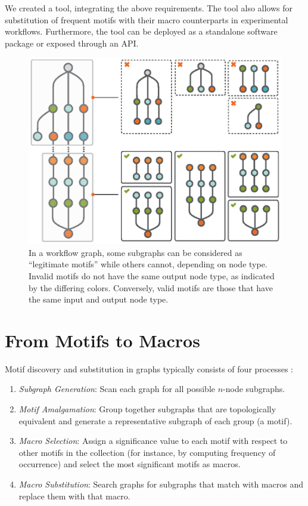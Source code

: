 We created a tool, integrating the above requirements.
The tool also allows for substitution of frequent motifs with their macro counterparts in experimental workflows.
Furthermore, the tool can be deployed as a standalone software package or exposed through an API.

\begin{figure}[t!]
\centering
\includegraphics[scale=.6]{images/automacron/valid-invalid-motifs.eps}
\caption{In a workflow graph, some subgraphs can be considered as ``legitimate motifs'' while others cannot, depending on node type. Invalid motifs do not have the same output node type, as indicated by the differing colors. Conversely, valid motifs are those that have the same input and output node type.}
\vspace{-3mm}
\label{fig:Conditions}
\end{figure}
\section{From Motifs to Macros}
\label{sec:Motif}

Motif discovery and substitution in graphs typically consists of four processes \cite{Milo:2002,Alon:2007}:

\vspace{-2mm}
\begin{enumerate}[itemsep=-1mm]
\item \emph{Subgraph Generation}: Scan each graph for all possible $n$-node subgraphs.
\item \emph{Motif Amalgamation}: Group together subgraphs that are topologically equivalent and generate a representative subgraph of each group (a motif).
\item \emph{Macro Selection}: Assign a significance value to each motif with respect to other motifs in the collection (for instance, by computing frequency of occurrence) and select the most significant motifs as macros.
\item \emph{Macro Substitution}: Search graphs for subgraphs that match with macros and replace them with that macro.
\end{enumerate}

